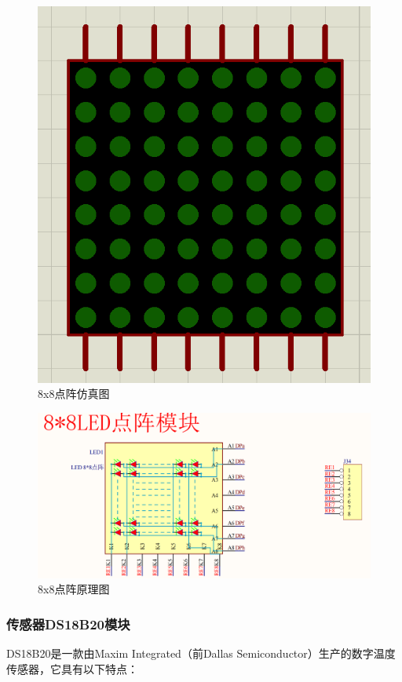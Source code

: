 \documentclass{textreportclass}  %
\begin{document}
	\begin{figure}[htbp]
		\centering
		\includegraphics[scale=0.3]{Fig/点阵仿真图.png}
		\caption{8x8点阵仿真图}\label{Fig.22}
	\end{figure}
	
	
	\begin{figure}[htbp]
		\centering
		\includegraphics[scale=0.3]{Fig/点阵原理图.png}
		\caption{8x8点阵原理图}\label{Fig.23}
	\end{figure}
	
	\subsubsection{传感器DS18B20模块}			  %
	DS18B20是一款由Maxim Integrated（前Dallas Semiconductor）生产的数字温度传感器，它具有以下特点：
	
\end{document}
